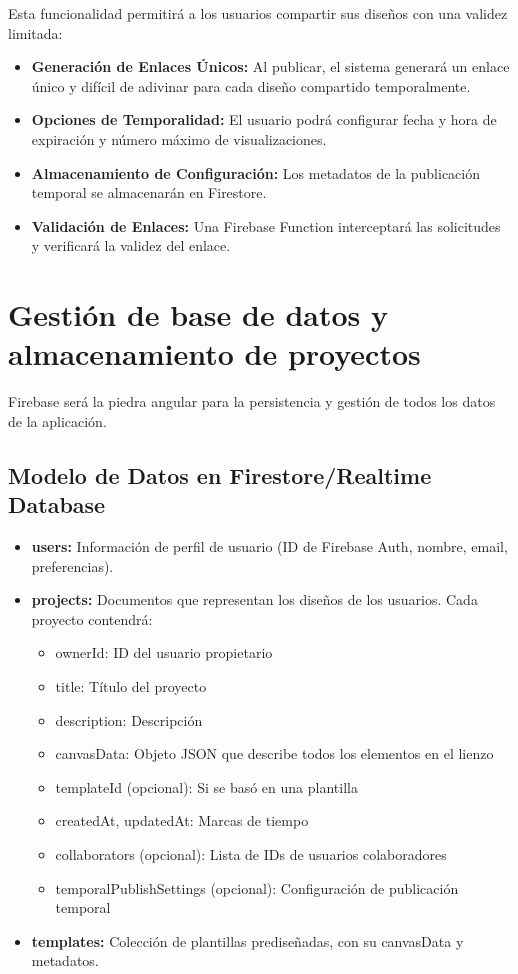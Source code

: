 \documentclass[12pt,a4paper]{report}
\begin{document}
Esta funcionalidad permitirá a los usuarios compartir sus diseños con una validez limitada:

\begin{itemize}
\item \textbf{Generación de Enlaces Únicos:} Al publicar, el sistema generará un enlace único y difícil de adivinar para cada diseño compartido temporalmente.

\item \textbf{Opciones de Temporalidad:} El usuario podrá configurar fecha y hora de expiración y número máximo de visualizaciones.

\item \textbf{Almacenamiento de Configuración:} Los metadatos de la publicación temporal se almacenarán en Firestore.

\item \textbf{Validación de Enlaces:} Una Firebase Function interceptará las solicitudes y verificará la validez del enlace.
\end{itemize}

\section{Gestión de base de datos y almacenamiento de proyectos}

Firebase será la piedra angular para la persistencia y gestión de todos los datos de la aplicación.

\subsection{Modelo de Datos en Firestore/Realtime Database}

\begin{itemize}
\item \textbf{users:} Información de perfil de usuario (ID de Firebase Auth, nombre, email, preferencias).

\item \textbf{projects:} Documentos que representan los diseños de los usuarios. Cada proyecto contendrá:
\begin{itemize}
\item ownerId: ID del usuario propietario
\item title: Título del proyecto
\item description: Descripción
\item canvasData: Objeto JSON que describe todos los elementos en el lienzo
\item templateId (opcional): Si se basó en una plantilla
\item createdAt, updatedAt: Marcas de tiempo
\item collaborators (opcional): Lista de IDs de usuarios colaboradores
\item temporalPublishSettings (opcional): Configuración de publicación temporal
\end{itemize}

\item \textbf{templates:} Colección de plantillas prediseñadas, con su canvasData y metadatos.
\end{itemize}
\end{document}
